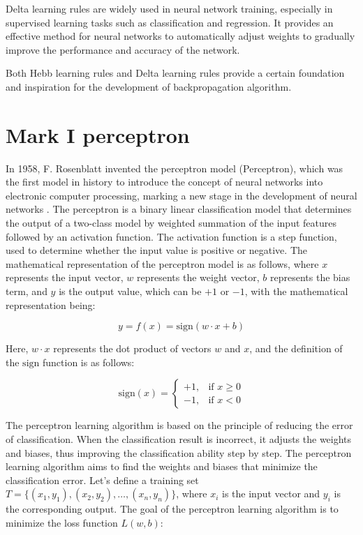 \documentclass[12pt,a4paper]{report}
\begin{document}
Delta learning rules are widely used in neural network training, especially in supervised learning tasks such as classification and regression. It provides an effective method for neural networks to automatically adjust weights to gradually improve the performance and accuracy of the network.

Both Hebb learning rules and Delta learning rules provide a certain foundation and inspiration for the development of backpropagation algorithm.



\section{Mark I perceptron}

In 1958, F. Rosenblatt invented the perceptron model (Perceptron), which was the first model in history to introduce the concept of neural networks into electronic computer processing, marking a new stage in the development of neural networks \cite{Rosenblatt1958PerceptronProbabilisticModel}. The perceptron is a binary linear classification model that determines the output of a two-class model by weighted summation of the input features followed by an activation function. The activation function is a step function, used to determine whether the input value is positive or negative. The mathematical representation of the perceptron model is as follows, where \( x \) represents the input vector, \( w \) represents the weight vector, \( b \) represents the bias term, and \( y \) is the output value, which can be \(+1\) or \(-1\), with the mathematical representation being:

\begin{equation}
    y = f(x) = \text{sign}(w \cdot x + b)
\end{equation}

Here, \( w \cdot x \) represents the dot product of vectors \( w \) and \( x \), and the definition of the \( \text{sign} \) function is as follows:

\begin{equation}
    \text{sign}(x) = 
\begin{cases}
+1, & \text{if } x \geq 0 \\
-1, & \text{if } x < 0
\end{cases}
\end{equation}


The perceptron learning algorithm is based on the principle of reducing the error of classification. When the classification result is incorrect, it adjusts the weights and biases, thus improving the classification ability step by step. The perceptron learning algorithm aims to find the weights and biases that minimize the classification error. Let's define a training set \( T = \{(x_1, y_1), (x_2, y_2), \ldots, (x_n, y_n)\} \), where \( x_i \) is the input vector and \( y_i \) is the corresponding output. The goal of the perceptron learning algorithm is to minimize the loss function \( L(w,b) \):
\end{document}
